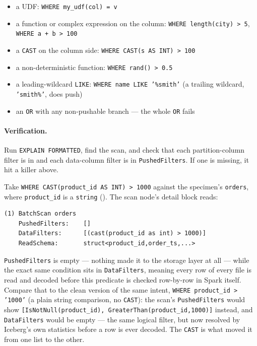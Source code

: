 \begin{itemize}
  \item a UDF: \texttt{WHERE my\_udf(col) = v}
  \item a function or complex expression on the column: \texttt{WHERE
        length(city) > 5}, \texttt{WHERE a + b > 100}
  \item a \texttt{CAST} on the column side: \texttt{WHERE CAST(s AS INT) > 100}
  \item a non-deterministic function: \texttt{WHERE rand() > 0.5}
  \item a leading-wildcard \texttt{LIKE}: \texttt{WHERE name LIKE '\%smith'}
        (a trailing wildcard, \texttt{'smith\%'}, does push)
  \item an \texttt{OR} with any non-pushable branch --- the whole \texttt{OR} fails
\end{itemize}

\paragraph{Verification.} Run \texttt{EXPLAIN FORMATTED}, find the scan, and check
that each partition-column filter is in  and each
data-column filter is in \texttt{PushedFilters}. If one is missing, it hit a
killer above.

Take \texttt{WHERE CAST(product\_id AS INT) > 1000} against the specimen's
\texttt{orders}, where \texttt{product\_id} is a \texttt{string}
(). The scan node's detail block reads:

\begin{lstlisting}[language=text,numbers=none,caption={A CAST silently killing pushdown},captionpos=b]
(1) BatchScan orders
    PushedFilters:    []
    DataFilters:      [(cast(product_id as int) > 1000)]
    ReadSchema:       struct<product_id,order_ts,...>
\end{lstlisting}

\texttt{PushedFilters} is empty --- nothing made it to the storage layer at
all --- while the exact same condition sits in \texttt{DataFilters}, meaning
every row of every file is read and decoded before this predicate is
checked row-by-row in Spark itself. Compare that to the clean version of
the same intent, \texttt{WHERE product\_id > '1000'} (a plain string
comparison, no \texttt{CAST}): the scan's \texttt{PushedFilters} would show
\texttt{[IsNotNull(product\_id), GreaterThan(product\_id,1000)]} instead,
and \texttt{DataFilters} would be empty --- the same logical filter, but now
resolved by Iceberg's own statistics before a row is ever decoded. The
\texttt{CAST} is what moved it from one list to the other.
